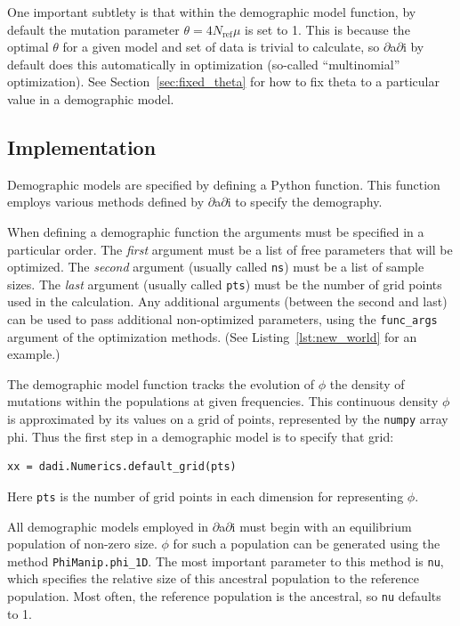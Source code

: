 \documentclass[12pt]{article}
\makeatletter
\newcommand{\dadi}{$\partial$a$\partial$i\xspace}
\newcommand{\Nref}{\ensuremath{N_\text{ref}}\xspace}
\newcommand{\py}[1]{\lstinline[language=Python, showstringspaces=False]@#1@}
\makeatother
\begin{document}
One important subtlety is that within the demographic model function, by default the mutation parameter $\theta = 4 \Nref \mu$ is set to 1.
This is because the optimal $\theta$ for a given model and set of data is trivial to calculate, so \dadi by default does this automatically in optimization (so-called ``multinomial'' optimization).
See Section~\ref{sec:fixed_theta} for how to fix theta to a particular value in a demographic model.

\subsection{Implementation}

Demographic models are specified by defining a Python function.
This function employs various methods defined by \dadi to specify the demography.

When defining a demographic function the arguments must be specified in a particular order.
The \emph{first} argument must be a list of free parameters that will be optimized.
The \emph{second} argument (usually called \py{ns}) must be a list of sample sizes.
The \emph{last} argument (usually called \py{pts}) must be the number of grid points used in the calculation.
Any additional arguments (between the second and last) can be used to pass additional non-optimized parameters, using the \py{func_args} argument of the optimization methods.
(See Listing~\ref{lst:new_world} for an example.)

The demographic model function tracks the evolution of $\phi$ the density of mutations within the populations at given frequencies.
This continuous density $\phi$ is approximated by its values on a grid of points, represented by the \py{numpy} array {phi}.
Thus the first step in a demographic model is to specify that grid:
\begin{lstlisting}
xx = dadi.Numerics.default_grid(pts)
\end{lstlisting}
Here \py{pts} is the number of grid points in each dimension for representing $\phi$.

All demographic models employed in \dadi must begin with an equilibrium population of non-zero size.
$\phi$ for such a population can be generated using the method \py{PhiManip.phi_1D}.
The most important parameter to this method is \py{nu}, which specifies the relative size of this ancestral population to the reference population.
Most often, the reference population is the ancestral, so \py{nu} defaults to 1.
\end{document}
